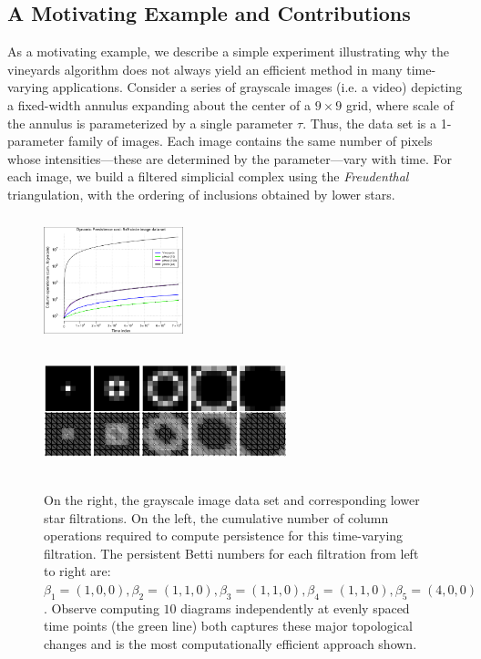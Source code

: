 \documentclass{siamart190516}
\begin{document}
 \subsection{A Motivating Example and Contributions}\label{sec:motivation} 
As a motivating example, we describe a simple experiment illustrating why the vineyards algorithm does not always yield an efficient method in many time-varying applications. 
Consider a series of grayscale images (i.e. a video) depicting a fixed-width annulus expanding about the center of a $9 \times 9$ grid, where scale of the annulus is parameterized by a single parameter $\tau$. Thus, the data set is a 1-parameter family of images. Each image contains the same number of pixels whose intensities---these are determined by the parameter---vary with time. For each image, we build a filtered simplicial complex using the \emph{Freudenthal} triangulation, with the ordering of inclusions obtained by lower stars.  
 \begin{figure}[t]
 	\centering
 	\includegraphics[width=0.36\textwidth, height = 1.45in]{circle_vineyards.png}
 	\includegraphics[width=0.63\textwidth, height = 1.45in]{circle_complex.png}
 	\caption{On the right, the grayscale image data set and corresponding lower star filtrations. On the left, the cumulative number of column operations required to compute persistence for this time-varying filtration. The persistent Betti numbers for each filtration from left to right are: $\beta_1 = (1,0,0), \beta_2 = (1,1,0), \beta_3 = (1,1,0), \beta_4 = (1,1,0), \beta_5 = (4,0,0)$. Observe computing $10$ diagrams independently at evenly spaced time points (the green line) both captures these major topological changes and is the most computationally efficient approach shown.}
 	\label{fig:vineyards}
 \end{figure}
\end{document}
